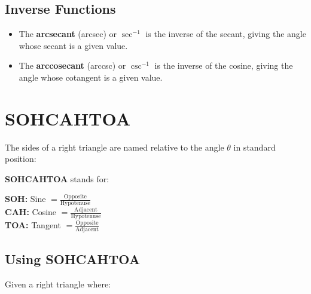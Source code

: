 \documentclass[12pt]{article}
\begin{document}
\subsection*{Inverse Functions}
\begin{itemize}
    \item The \textbf{arcsecant} (arcsec) or \textbf{$\sec^{-1}$} is the inverse of the secant, giving the angle whose secant is a given value.
    \item The \textbf{arccosecant} (arccsc) or \textbf{$\csc^{-1}$} is the inverse of the cosine, giving the angle whose cotangent is a given value.
\end{itemize}

\section*{SOHCAHTOA}
The sides of a right triangle are named relative to the angle $\theta$ in standard position:


\newpage

\textbf{SOHCAHTOA} stands for:
\begin{center}
\textbf{SOH:} Sine $= \frac{\textrm{Opposite}}{\textrm{Hypotenuse}}$\\
\vspace{8pt}
\textbf{CAH:} Cosine $= \frac{\textrm{Adjacent}}{\textrm{Hypotenuse}}$\\
\vspace{8pt}
\textbf{TOA:} Tangent $= \frac{\textrm{Opposite}}{\textrm{Adjacent}}$\\
\end{center}

\subsection*{Using SOHCAHTOA}
Given a right triangle where:
\end{document}
